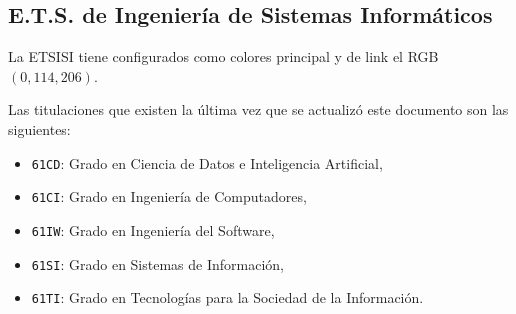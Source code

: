 \documentclass[%
    school=etsisi,%
    degree=61TI,%
]{upm-report}
\begin{document}
\subsection{E.T.S. de Ingeniería de Sistemas Informáticos}

La ETSISI tiene configurados como colores principal y de link el RGB $(0,114,206)$.

Las titulaciones que existen la última vez que se actualizó este documento son las siguientes:

\begin{itemize}
    \item \texttt{61CD}: Grado en Ciencia de Datos e Inteligencia Artificial,
    \item \texttt{61CI}: Grado en Ingeniería de Computadores,
    \item \texttt{61IW}: Grado en Ingeniería del Software,
    \item \texttt{61SI}: Grado en Sistemas de Información,
    \item \texttt{61TI}: Grado en Tecnologías para la Sociedad de la Información.
\end{itemize}
\end{document}
